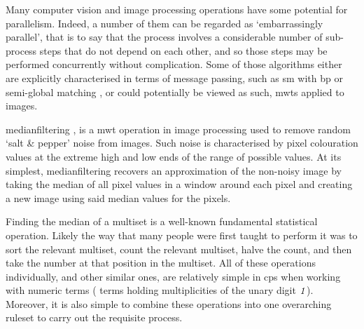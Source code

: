 Many computer vision and image processing operations have some potential for parallelism.  Indeed, a number of them can be regarded as `embarrassingly parallel', that is to say that the process involves a considerable number of sub-process steps that do not depend on each other, and so those steps may be performed concurrently without complication.  Some of those algorithms either are explicitly characterised in terms of message passing, such as \gls{sm} with \gls{bp} \cite{Liang2011} or semi-global matching \cite{Drory2014}, or could potentially be viewed as such, \eg{} \glspl{mwt} applied to images.

\Gls{medianfilter}ing \cite[Chap. 3.4.1]{Gimelfarb2018}, \cite{Fisher2016} is a \gls{mwt} operation in image processing used to remove random `salt \& pepper' noise from images.  Such noise is characterised by pixel colouration values at the extreme high and low ends of the range of possible values.  At its simplest, \gls{medianfilter}ing recovers an approximation of the non-noisy image by taking the median of all pixel values in a window around each pixel and creating a new image using said median values for the pixels.

Finding the median of a multiset is a well-known fundamental statistical operation.  Likely the way that many people were first taught to perform it was to sort the relevant multiset, count the relevant multiset, halve the count, and then take the number at that position in the multiset.  All of these operations individually, and other similar ones, are relatively simple in \gls{cps} when working with numeric terms (\ie{} terms holding multiplicities of the unary digit \(\mathit{1}\)).  Moreover, it is also simple to combine these operations into one overarching \gls{ruleset} to carry out the requisite process.


